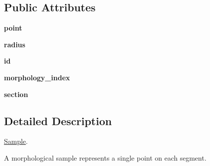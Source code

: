 \subsection*{Public Attributes}
\begin{DoxyCompactItemize}
\item 
{\bfseries point}\hypertarget{classmeshy_1_1neuromorphovis_1_1morphologies_1_1__skeleton_1_1sample_1_1Sample_a89dd268bf46170f6dcc149cd45e2348f}{}\label{classmeshy_1_1neuromorphovis_1_1morphologies_1_1__skeleton_1_1sample_1_1Sample_a89dd268bf46170f6dcc149cd45e2348f}

\item 
{\bfseries radius}\hypertarget{classmeshy_1_1neuromorphovis_1_1morphologies_1_1__skeleton_1_1sample_1_1Sample_abd18abc3df0037b8c783c56e1dfeb29a}{}\label{classmeshy_1_1neuromorphovis_1_1morphologies_1_1__skeleton_1_1sample_1_1Sample_abd18abc3df0037b8c783c56e1dfeb29a}

\item 
{\bfseries id}\hypertarget{classmeshy_1_1neuromorphovis_1_1morphologies_1_1__skeleton_1_1sample_1_1Sample_aa295372ec40b56912ddcadbf0253e368}{}\label{classmeshy_1_1neuromorphovis_1_1morphologies_1_1__skeleton_1_1sample_1_1Sample_aa295372ec40b56912ddcadbf0253e368}

\item 
{\bfseries morphology\+\_\+index}\hypertarget{classmeshy_1_1neuromorphovis_1_1morphologies_1_1__skeleton_1_1sample_1_1Sample_a4c50a12108d74975cce358b25f4c1696}{}\label{classmeshy_1_1neuromorphovis_1_1morphologies_1_1__skeleton_1_1sample_1_1Sample_a4c50a12108d74975cce358b25f4c1696}

\item 
{\bfseries section}\hypertarget{classmeshy_1_1neuromorphovis_1_1morphologies_1_1__skeleton_1_1sample_1_1Sample_a101094cb28629c53ebdd3edbf2cd3852}{}\label{classmeshy_1_1neuromorphovis_1_1morphologies_1_1__skeleton_1_1sample_1_1Sample_a101094cb28629c53ebdd3edbf2cd3852}

\end{DoxyCompactItemize}


\subsection{Detailed Description}
\hyperlink{classmeshy_1_1neuromorphovis_1_1morphologies_1_1__skeleton_1_1sample_1_1Sample}{Sample}. 

\begin{DoxyVerb}A morphological sample represents a single point on each segment. \end{DoxyVerb}
 

